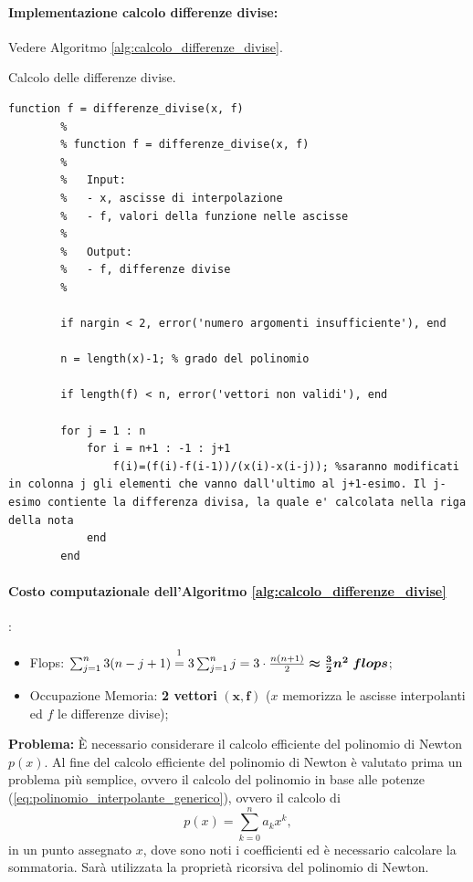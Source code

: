 \paragraph{Implementazione calcolo differenze divise:} Vedere Algoritmo \ref{alg:calcolo_differenze_divise}.

\begin{algorithm}
\caption{Calcolo delle differenze divise.}\label{alg:calcolo_differenze_divise}
    \begin{lstlisting}[style=Matlab-editor]
    	function f = differenze_divise(x, f)
    	%
    	% function f = differenze_divise(x, f)
    	%
    	%	Input:
        %	- x, ascisse di interpolazione
        % 	- f, valori della funzione nelle ascisse
        %
        %	Output:
        %	- f, differenze divise
        %
        
        if nargin < 2, error('numero argomenti insufficiente'), end
        
        n = length(x)-1; % grado del polinomio
        
        if length(f) < n, error('vettori non validi'), end
        
        for j = 1 : n
            for i = n+1 : -1 : j+1
                f(i)=(f(i)-f(i-1))/(x(i)-x(i-j)); %saranno modificati in colonna j gli elementi che vanno dall'ultimo al j+1-esimo. Il j-esimo contiente la differenza divisa, la quale e' calcolata nella riga della nota
            end
        end
    \end{lstlisting}
\end{algorithm}

\paragraph{\textbf{Costo computazionale} dell'\textbf{Algoritmo \ref{alg:calcolo_differenze_divise}}}:
    \begin{itemize}
        \item Flops: $\sum_{j=1}^{n}3(n-j+1)\overset{\footnotemark}{=} 3\sum_{j=1}^{n}j=3\cdot\frac{n(n+1)}{2}\boldsymbol{\approx \frac{3}{2}n^2\; flops}$; 
        \item Occupazione Memoria: \textbf{2 vettori} $\boldsymbol{(x, f)}$ ($x$ memorizza le ascisse interpolanti ed $f$ le differenze divise);
    \end{itemize}

\noindent\textbf{Problema:} È necessario considerare il calcolo efficiente del polinomio di Newton $p(x)$. Al fine del calcolo efficiente del polinomio di Newton è valutato prima un problema più semplice, ovvero il calcolo del polinomio in base alle potenze (\ref{eq:polinomio_interpolante_generico}), ovvero il calcolo di
\begin{equation}\label{eq:polinomio_generico_ridef}
	p(x)=\sum_{k=0}^{n}a_kx^k,
\end{equation}
in un punto assegnato $x$, dove sono noti i coefficienti ed è necessario calcolare la sommatoria. Sarà utilizzata la proprietà ricorsiva del polinomio di Newton.

